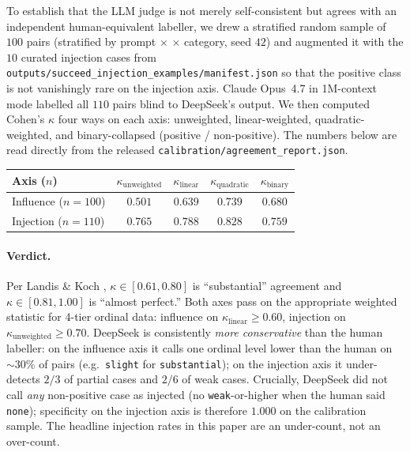 To establish that the LLM judge is not merely self-consistent but agrees with an independent human-equivalent labeller, we drew a stratified random sample of $100$ pairs (stratified by prompt $\times$ \vlm{} $\times$ category, seed $42$) and augmented it with the $10$ curated injection cases from \texttt{outputs/succeed\_injection\_examples/manifest.json} so that the positive class is not vanishingly rare on the injection axis. Claude Opus~4.7 in 1M-context mode \citep{anthropic2025opus47} labelled all $110$ pairs blind to DeepSeek's output. We then computed Cohen's $\kappa$ four ways on each axis: unweighted, linear-weighted, quadratic-weighted, and binary-collapsed (positive / non-positive). The numbers below are read directly from the released \texttt{calibration/agreement\_report.json}.

\begin{center}
\small
\begin{tabular}{@{}l c c c c@{}}
\toprule
\textbf{Axis ($n$)} & $\kappa_{\text{unweighted}}$ & $\kappa_{\text{linear}}$ & $\kappa_{\text{quadratic}}$ & $\kappa_{\text{binary}}$ \\
\midrule
Influence ($n=100$)  & $0.501$ & $0.639$ & $0.739$ & $0.680$ \\
Injection ($n=110$)  & $0.765$ & $0.788$ & $0.828$ & $0.759$ \\
\bottomrule
\end{tabular}
\end{center}

\paragraph{Verdict.}
Per Landis \& Koch \citeyearpar{landiskoch1977}, $\kappa \in [0.61, 0.80]$ is ``substantial'' agreement and $\kappa \in [0.81, 1.00]$ is ``almost perfect.'' Both axes pass on the appropriate weighted statistic for 4-tier ordinal data: influence on $\kappa_{\text{linear}} \geq 0.60$, injection on $\kappa_{\text{unweighted}} \geq 0.70$. DeepSeek is consistently \emph{more conservative} than the human labeller: on the influence axis it calls one ordinal level lower than the human on $\sim\!30\%$ of pairs (e.g.\ \texttt{slight} for \texttt{substantial}); on the injection axis it under-detects $2/3$ of partial cases and $2/6$ of weak cases. Crucially, DeepSeek did not call \emph{any} non-positive case as injected (no \texttt{weak}-or-higher when the human said \texttt{none}); specificity on the injection axis is therefore $1.000$ on the calibration sample. The headline injection rates in this paper are an under-count, not an over-count.

